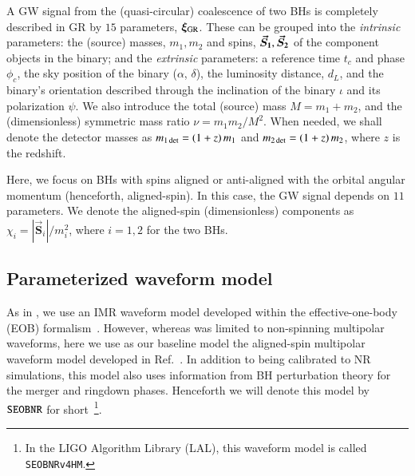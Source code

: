 A GW signal from the (quasi-circular) coalescence of two BHs is
completely described in GR by $15$ parameters,
$\bm{\xi}_{\text{GR}}$. These can be grouped into the \emph{intrinsic} parameters:
the (source) masses, $m_1, m_2$ and spins, $\bm{\vec{S}_{1}}, \bm{\vec{S}_{2}}$ of the component
objects in the binary; and the
\emph{extrinsic} parameters: a reference time $t_c$ and phase
$\phi_c$, the sky position of the binary ($\alpha$,
$\delta$), the luminosity distance, $d_L$, and the binary's orientation
described through the inclination of the binary $\iota$ and its
polarization $\psi$. We also introduce the total (source) mass $M = m_1+m_2$,
and the (dimensionless) symmetric mass ratio $\nu = m_1m_2/M^2$.  When needed, 
we shall denote the detector masses as $m_{1\,\rm det}= (1+z)\,m_1$ and $m_{2 \,\rm det} = (1+z)\,m_2$, 
where $z$ is the redshift.

Here, we focus on BHs with spins aligned or anti-aligned
with the orbital angular momentum (henceforth, aligned-spin). In this case,
the GW signal depends on $11$ parameters. We denote the
aligned-spin (dimensionless) components as $\chi_{i} = |\vec{\bm{S}}_i|/m^2_i$, where $i=1,2$ for the two BHs.

\subsection{Parameterized waveform model}\label{sec:model}

As in \paperone, we use an IMR waveform model developed within the effective-one-body (EOB)
formalism~\cite{Buonanno:1998gg,Buonanno:2000ef}. However, whereas \paperone was limited to non-spinning multipolar waveforms,
here we use as our baseline model the aligned-spin multipolar waveform model
developed in Ref.~\cite{Cotesta:2018fcv}. In addition to being
calibrated to NR simulations, this model also uses information from BH
perturbation theory for the merger and ringdown phases. Henceforth we
will denote this model by $\texttt{SEOBNR}$ for short~\footnote{In the LIGO Algorithm Library (LAL), this
waveform model is called {\tt SEOBNRv4HM}.}.


